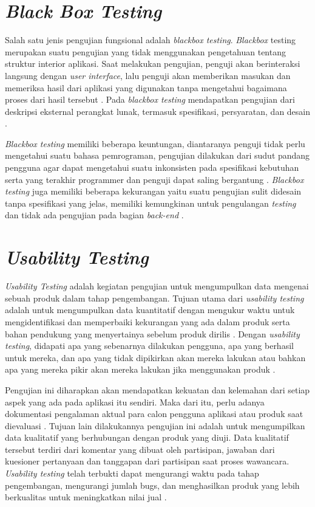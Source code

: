 \section{\textit{Black Box Testing}}
Salah satu jenis pengujian fungsional adalah \textit{blackbox testing}. \textit{Blackbox} testing merupakan suatu pengujian yang tidak menggunakan pengetahuan tentang struktur interior aplikasi. Saat melakukan pengujian, penguji akan berinteraksi langsung dengan \textit{user interface}, lalu penguji akan memberikan masukan dan memeriksa hasil dari aplikasi yang digunakan tanpa mengetahui bagaimana proses dari hasil tersebut \citep{xu2016comparative}. Pada \textit{blackbox testing} mendapatkan pengujian dari deskripsi eksternal perangkat lunak, termasuk spesifikasi, persyaratan, dan desain \citep{ammann2016introduction}.

\par \textit{Blackbox testing} memiliki beberapa keuntungan, diantaranya penguji tidak perlu mengetahui suatu bahasa pemrograman, pengujian dilakukan dari sudut pandang pengguna agar dapat mengetahui suatu inkonsisten pada spesifikasi kebutuhan serta yang terakhir programmer dan penguji dapat saling bergantung \citep{jaya2018pengujian}. \textit{Blackbox testing} juga memiliki beberapa kekurangan yaitu suatu pengujian sulit didesain tanpa spesifikasi yang jelas, memiliki kemungkinan untuk pengulangan \textit{testing} dan tidak ada pengujian pada bagian \textit{back-end} \citep{jaya2018pengujian}.

\section{\textit{Usability Testing}}
\textit{Usability Testing} adalah kegiatan pengujian untuk mengumpulkan data mengenai sebuah produk dalam tahap pengembangan. Tujuan utama dari \textit{usability testing} adalah untuk mengumpulkan data kuantitatif dengan mengukur waktu untuk mengidentifikasi dan memperbaiki kekurangan yang ada dalam produk serta bahan pendukung yang menyertainya sebelum produk dirilis \citep{barnum2020usability}. Dengan \textit{usability testing}, didapati apa yang sebenarnya dilakukan pengguna, apa yang berhasil untuk mereka, dan apa yang tidak dipikirkan akan mereka lakukan atau bahkan apa yang mereka pikir akan mereka lakukan jika menggunakan produk \citep{barnum2020usability}.


\par Pengujian ini diharapkan akan mendapatkan kekuatan dan kelemahan dari setiap aspek yang ada pada aplikasi itu sendiri. Maka dari itu, perlu adanya dokumentasi pengalaman aktual para calon pengguna aplikasi atau produk saat dievaluasi \citep{wesfix2017branding}. Tujuan lain dilakukannya pengujian ini adalah untuk mengumpilkan data kualitatif yang berhubungan dengan produk yang diuji. Data kualitatif tersebut terdiri dari komentar yang dibuat oleh partisipan, jawaban dari kuesioner pertanyaan dan tanggapan dari partisipan saat proses wawancara. \textit{Usability testing} telah terbukti dapat mengurangi waktu pada tahap pengembangan, mengurangi jumlah bugs, dan menghasilkan produk yang lebih berkualitas untuk meningkatkan nilai jual \citep{wesfix2017branding}.

